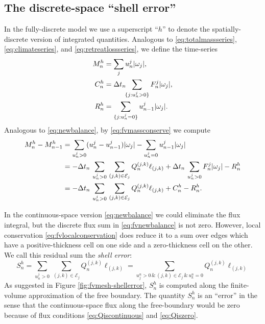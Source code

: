 \documentclass[final,leqno,onefignum,onetabnum]{siamltex1213bueler}
\begin{document}
\subsection{The discrete-space ``shell error''}  \label{subsec:shellerror}  In the fully-discrete model we use a superscript ``$h$'' to denote the spatially-discrete version of integrated quantities.  Analogous to \eqref{eq:totalmassseries}, \eqref{eq:climateseries}, and \eqref{eq:retreatlossseries}, we define the time-series
\begin{align}
M_n^h &= \sum_j u_n^j |\omega_j|, \label{eq:fvtimeseriesdefn} \\
C_n^h &= \Delta t_n\!\!\sum_{\{j:u_n^j>0\}} F_n^j |\omega_j|,  \notag \\
R_n^h &= \sum_{\{j:u_n^j=0\}} u_{n-1}^j |\omega_j|.  \notag
\end{align}
Analogous to \eqref{eq:newbalance}, by \eqref{eq:fvmassconserve} we compute
\begin{align}
M_n^h - M_{n-1}^h &= \sum_{u_n^j>0} (u_n^j - u_{n-1}^j) |\omega_j| - \sum_{u_n^j=0} u_{n-1}^j |\omega_j| \notag \\
   &= - \Delta t_n\,\sum_{u_n^j>0}\, \sum_{(j,k)\in\mathcal{E}_j} Q_n^{(j,k)} \ell_{(j,k)} + \Delta t_n\,\sum_{u_n^j>0} F_n^j |\omega_j| - R_n^h \notag \\
   &= - \Delta t_n\,\sum_{u_n^j>0}\, \sum_{(j,k)\in\mathcal{E}_j} Q_n^{(j,k)} \ell_{(j,k)} + C_n^h - R_n^h.  \label{eq:fvnewbalance}
\end{align}

In the continuous-space version \eqref{eq:newbalance} we could eliminate the flux integral, but the discrete flux sum in \eqref{eq:fvnewbalance} is not zero.  However, local conservation \eqref{eq:fvlocalconservation} does reduce it to a sum over edges which have a positive-thickness cell on one side and a zero-thickness cell on the other.  We call this residual sum the \emph{shell error}:
\begin{equation}
S_n^h = \sum_{u_n^j>0}\, \sum_{(j,k)\in\mathcal{E}_j} Q_n^{(j,k)} \ell_{(j,k)} = \sum_{u_j^n > 0 \,\&\, (j,k)\in\mathcal{E}_j \,\&\, u_k^n = 0} Q_n^{(j,k)} \ell_{(j,k)} \label{eq:fvderiveshellerror}
\end{equation}
As suggested in Figure \ref{fig:fvmesh-shellerror}, $S_n^h$ is computed along the finite-volume approximation of the free boundary.  The quantity $S_n^h$ is an ``error'' in the sense that the continuous-space flux along the free-boundary would be zero because of flux conditions \eqref{eq:Qiscontinuous} and \eqref{eq:Qiszero}.
\end{document}
